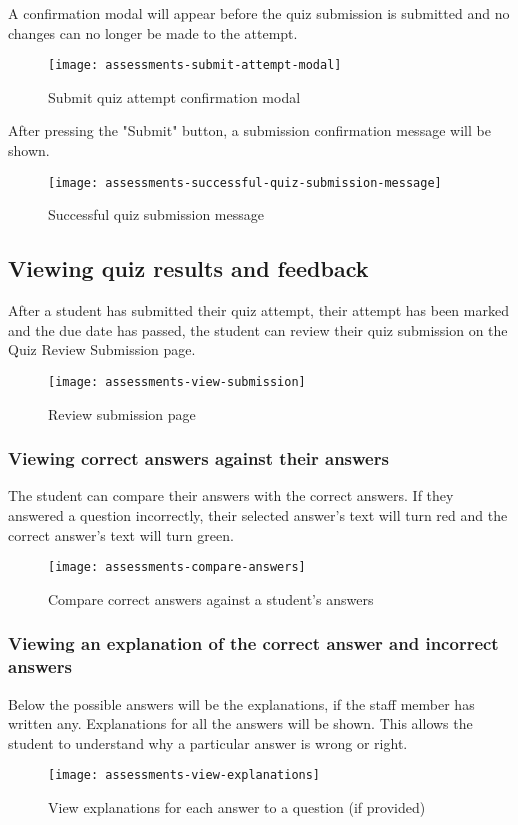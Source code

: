 A confirmation modal will appear before the quiz submission is submitted and no changes can no longer be made to the attempt.

\begin{figure}[!hbpt]
	\centering
	\texttt{[image: assessments-submit-attempt-modal]}
	\caption{Submit quiz attempt confirmation modal}
\end{figure}

After pressing the "Submit" button, a submission confirmation message will be shown.

\begin{figure}[!hbpt]
	\centering
	\texttt{[image: assessments-successful-quiz-submission-message]}
	\caption{Successful quiz submission message}
\end{figure}


\subsection{Viewing quiz results and feedback}
After a student has submitted their quiz attempt, their attempt has been marked and the due date has passed, the student can review their quiz submission on the Quiz Review Submission page.

\begin{figure}[!hbpt]
	\centering
	\texttt{[image: assessments-view-submission]}
	\caption{Review submission page}
\end{figure}

\subsubsection{Viewing correct answers against their answers}
The student can compare their answers with the correct answers. If they answered a question incorrectly, their selected answer's text will turn red and the correct answer's text will turn green.

\begin{figure}[!hbpt]
	\centering
	\texttt{[image: assessments-compare-answers]}
	\caption{Compare correct answers against a student's answers}
\end{figure}


\subsubsection{Viewing an explanation of the correct answer and incorrect answers}
Below the possible answers will be the explanations, if the staff member has written any. Explanations for all the answers will be shown. This allows the student to understand why a particular answer is wrong or right.

\begin{figure}[!hbpt]
	\centering
	\texttt{[image: assessments-view-explanations]}
	\caption{View explanations for each answer to a question (if provided)}
\end{figure}

